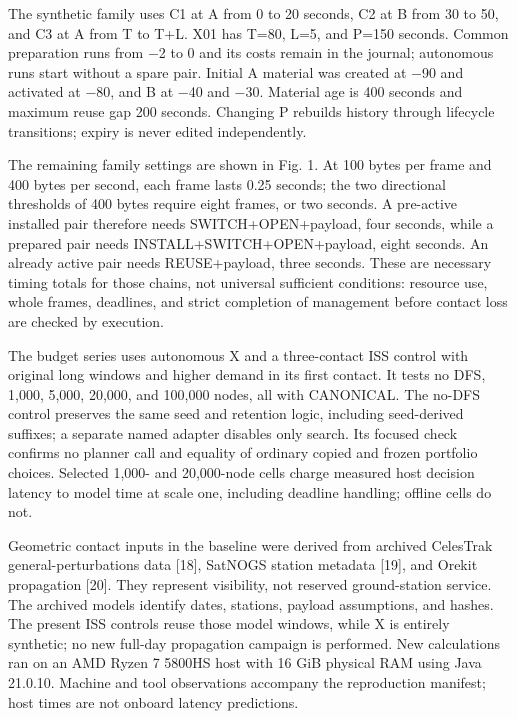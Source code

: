 \documentclass[12pt,a4paper]{article}
\begin{document}
The synthetic family uses C1 at A from 0 to 20 seconds, C2 at B from 30 to 50, and C3 at A from T to T+L. X01 has T=80, L=5, and P=150 seconds. Common preparation runs from $-$2 to 0 and its costs remain in the journal; autonomous runs start without a spare pair. Initial A material was created at $-$90 and activated at $-$80, and B at $-$40 and $-$30. Material age is 400 seconds and maximum reuse gap 200 seconds. Changing P rebuilds history through lifecycle transitions; expiry is never edited independently.

The remaining family settings are shown in Fig. 1. At 100 bytes per frame and 400 bytes per second, each frame lasts 0.25 seconds; the two directional thresholds of 400 bytes require eight frames, or two seconds. A pre-active installed pair therefore needs SWITCH+OPEN+payload, four seconds, while a prepared pair needs INSTALL+SWITCH+OPEN+payload, eight seconds. An already active pair needs REUSE+payload, three seconds. These are necessary timing totals for those chains, not universal sufficient conditions: resource use, whole frames, deadlines, and strict completion of management before contact loss are checked by execution.

The budget series uses autonomous X and a three-contact ISS control with original long windows and higher demand in its first contact. It tests no DFS, 1,000, 5,000, 20,000, and 100,000 nodes, all with CANONICAL. The no-DFS control preserves the same seed and retention logic, including seed-derived suffixes; a separate named adapter disables only search. Its focused check confirms no planner call and equality of ordinary copied and frozen portfolio choices. Selected 1,000- and 20,000-node cells charge measured host decision latency to model time at scale one, including deadline handling; offline cells do not.

Geometric contact inputs in the baseline were derived from archived CelesTrak general-perturbations data [18], SatNOGS station metadata [19], and Orekit propagation [20]. They represent visibility, not reserved ground-station service. The archived models identify dates, stations, payload assumptions, and hashes. The present ISS controls reuse those model windows, while X is entirely synthetic; no new full-day propagation campaign is performed. New calculations ran on an AMD Ryzen 7 5800HS host with 16 GiB physical RAM using Java 21.0.10. Machine and tool observations accompany the reproduction manifest; host times are not onboard latency predictions.
\end{document}

